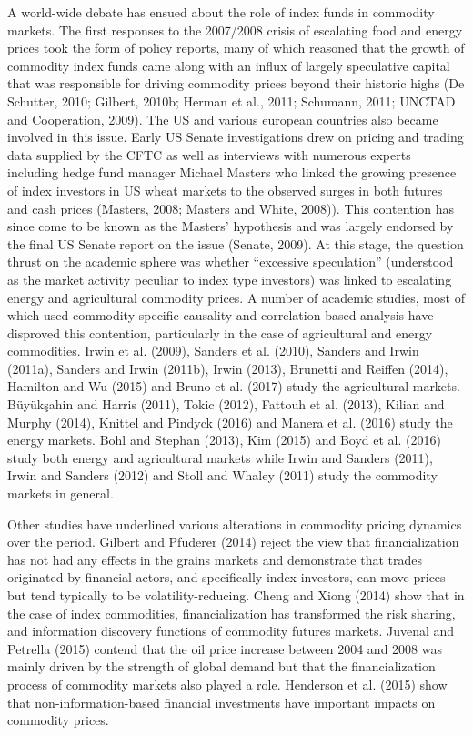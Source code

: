 \documentclass[]{elsarticle} %
\begin{document}
A world-wide debate has ensued about the role of index funds in
commodity markets. The first responses to the 2007/2008 crisis of
escalating food and energy prices took the form of policy reports, many
of which reasoned that the growth of commodity index funds came along
with an influx of largely speculative capital that was responsible for
driving commodity prices beyond their historic highs (De Schutter, 2010;
Gilbert, 2010b; Herman et al., 2011; Schumann, 2011; UNCTAD and
Cooperation, 2009). The US and various european countries also became
involved in this issue. Early US Senate investigations drew on pricing
and trading data supplied by the CFTC as well as interviews with
numerous experts including hedge fund manager Michael Masters who linked
the growing presence of index investors in US wheat markets to the
observed surges in both futures and cash prices (Masters, 2008; Masters
and White, 2008)). This contention has since come to be known as the
Masters' hypothesis and was largely endorsed by the final US Senate
report on the issue (Senate, 2009). At this stage, the question thrust
on the academic sphere was whether ``excessive speculation'' (understood
as the market activity peculiar to index type investors) was linked to
escalating energy and agricultural commodity prices. A number of
academic studies, most of which used commodity specific causality and
correlation based analysis have disproved this contention, particularly
in the case of agricultural and energy commodities. Irwin et al. (2009),
Sanders et al. (2010), Sanders and Irwin (2011a), Sanders and Irwin
(2011b), Irwin (2013), Brunetti and Reiffen (2014), Hamilton and Wu
(2015) and Bruno et al. (2017) study the agricultural markets.
Büyükşahin and Harris (2011), Tokic (2012), Fattouh et al. (2013),
Kilian and Murphy (2014), Knittel and Pindyck (2016) and Manera et al.
(2016) study the energy markets. Bohl and Stephan (2013), Kim (2015) and
Boyd et al. (2016) study both energy and agricultural markets while
Irwin and Sanders (2011), Irwin and Sanders (2012) and Stoll and Whaley
(2011) study the commodity markets in general.

Other studies have underlined various alterations in commodity pricing
dynamics over the period. Gilbert and Pfuderer (2014) reject the view
that financialization has not had any effects in the grains markets and
demonstrate that trades originated by financial actors, and specifically
index investors, can move prices but tend typically to be
volatility-reducing. Cheng and Xiong (2014) show that in the case of
index commodities, financialization has transformed the risk sharing,
and information discovery functions of commodity futures markets.
Juvenal and Petrella (2015) contend that the oil price increase between
2004 and 2008 was mainly driven by the strength of global demand but
that the financialization process of commodity markets also played a
role. Henderson et al. (2015) show that non-information-based financial
investments have important impacts on commodity prices.
\end{document}
